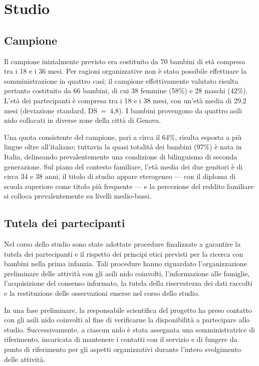  \section{Studio}
 \label{sec:4_2}

\FloatBarrier

 \subsection{Campione}
 \label{sec:4_2_1}

Il campione inizialmente previsto era costituito da 70 bambini di età compresa tra i 18 e i 36 mesi. Per ragioni organizzative non è stato possibile effettuare la somministrazione in quattro casi; il campione effettivamente valutato risulta pertanto costituito da 66 bambini, di cui 38 femmine (58\%) e 28 maschi (42\%). L'età dei partecipanti è compresa tra i 18 e i 38 mesi, con un'età media di 29,2 mesi (deviazione standard, DS~=~4,8). I bambini provengono da quattro asili nido collocati in diverse zone della città di Genova.

Una quota consistente del campione, pari a circa il 64\%, risulta esposta a più lingue oltre all'italiano; tuttavia la quasi totalità dei bambini (97\%) è nata in Italia, delineando prevalentemente una condizione di bilinguismo di seconda generazione. Sul piano del contesto familiare, l'età media dei due genitori è di circa 34 e 38 anni, il titolo di studio appare eterogeneo --- con il diploma di scuola superiore come titolo più frequente --- e la percezione del reddito familiare si colloca prevalentemente su livelli medio-bassi.

\FloatBarrier

 \subsection{Tutela dei partecipanti}
 \label{sec:4_2_2}

Nel corso dello studio sono state adottate procedure finalizzate a garantire la tutela dei partecipanti e il rispetto dei principi etici previsti per la ricerca con bambini nella prima infanzia. Tali procedure hanno riguardato l'organizzazione preliminare delle attività con gli asili nido coinvolti, l'informazione alle famiglie, l'acquisizione del consenso informato, la tutela della riservatezza dei dati raccolti e la restituzione delle osservazioni emerse nel corso dello studio.

In una fase preliminare, la responsabile scientifica del progetto ha preso contatto con gli asili nido coinvolti al fine di verificarne la disponibilità a partecipare allo studio. Successivamente, a ciascun nido è stata assegnata una somministratrice di riferimento, incaricata di mantenere i contatti con il servizio e di fungere da punto di riferimento per gli aspetti organizzativi durante l'intero svolgimento delle attività.


